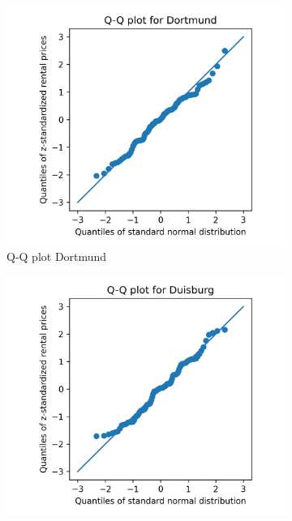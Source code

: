 \documentclass[12 pt]{scrartcl}
\begin{document}
\begin{figure}[h]
  \centering
  \begin{subfigure}[b]{0.40\textwidth}
    \centering
    \includegraphics[width=\textwidth]{./images/qqplot-Dortmundc}
    \caption{Q-Q plot Dortmund}
    \label{fig:qqplot-Dortmund}
  \end{subfigure}
  \begin{subfigure}[b]{0.40\textwidth}
    \centering
    \includegraphics[width=\textwidth]{./images/qqplot-Duisburgc}

\end{subfigure}
\end{figure}
\end{document}
